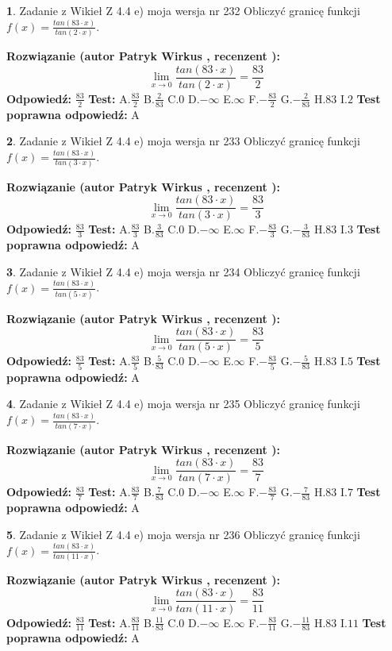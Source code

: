 \documentclass[12pt, a4paper]{article}
\theoremstyle{definition} %
\newtheorem{zad}{}
\newcommand{\zadStart}[1]{\begin{zad}#1\newline}
\newcommand{\zadStop}{\end{zad}}
\newcommand{\rozwStart}[2]{\noindent \textbf{Rozwiązanie (autor #1 , recenzent #2): }\newline}
\newcommand{\rozwStop}{\newline}
\newcommand{\odpStart}{\noindent \textbf{Odpowiedź:}\newline}
\newcommand{\odpStop}{\newline}
\newcommand{\testStart}{\noindent \textbf{Test:}\newline}
\newcommand{\testStop}{\newline}
\newcommand{\kluczStart}{\noindent \textbf{Test poprawna odpowiedź:}\newline}
\newcommand{\kluczStop}{\newline}
\begin{document}
\zadStart{Zadanie z Wikieł Z 4.4 e) moja wersja nr 232}
Obliczyć granicę funkcji $f(x)=\frac{tan(83\cdot x)}{tan(2\cdot x)}$.
\zadStop
\rozwStart{Patryk Wirkus}{}
$$\lim\limits_{x\to 0}\frac{tan(83\cdot x)}{tan(2\cdot x)}=
\frac{83}{2}$$
\rozwStop
\odpStart
$\frac{83}{2}$
\odpStop
\testStart
A.$\frac{83}{2}$
B.$\frac{2}{83}$
C.$0$
D.$-\infty$
E.$\infty$
F.$-\frac{83}{2}$
G.$-\frac{2}{83}$
H.$83$
I.$2$
\testStop
\kluczStart
A
\kluczStop



\zadStart{Zadanie z Wikieł Z 4.4 e) moja wersja nr 233}
Obliczyć granicę funkcji $f(x)=\frac{tan(83\cdot x)}{tan(3\cdot x)}$.
\zadStop
\rozwStart{Patryk Wirkus}{}
$$\lim\limits_{x\to 0}\frac{tan(83\cdot x)}{tan(3\cdot x)}=
\frac{83}{3}$$
\rozwStop
\odpStart
$\frac{83}{3}$
\odpStop
\testStart
A.$\frac{83}{3}$
B.$\frac{3}{83}$
C.$0$
D.$-\infty$
E.$\infty$
F.$-\frac{83}{3}$
G.$-\frac{3}{83}$
H.$83$
I.$3$
\testStop
\kluczStart
A
\kluczStop



\zadStart{Zadanie z Wikieł Z 4.4 e) moja wersja nr 234}
Obliczyć granicę funkcji $f(x)=\frac{tan(83\cdot x)}{tan(5\cdot x)}$.
\zadStop
\rozwStart{Patryk Wirkus}{}
$$\lim\limits_{x\to 0}\frac{tan(83\cdot x)}{tan(5\cdot x)}=
\frac{83}{5}$$
\rozwStop
\odpStart
$\frac{83}{5}$
\odpStop
\testStart
A.$\frac{83}{5}$
B.$\frac{5}{83}$
C.$0$
D.$-\infty$
E.$\infty$
F.$-\frac{83}{5}$
G.$-\frac{5}{83}$
H.$83$
I.$5$
\testStop
\kluczStart
A
\kluczStop



\zadStart{Zadanie z Wikieł Z 4.4 e) moja wersja nr 235}
Obliczyć granicę funkcji $f(x)=\frac{tan(83\cdot x)}{tan(7\cdot x)}$.
\zadStop
\rozwStart{Patryk Wirkus}{}
$$\lim\limits_{x\to 0}\frac{tan(83\cdot x)}{tan(7\cdot x)}=
\frac{83}{7}$$
\rozwStop
\odpStart
$\frac{83}{7}$
\odpStop
\testStart
A.$\frac{83}{7}$
B.$\frac{7}{83}$
C.$0$
D.$-\infty$
E.$\infty$
F.$-\frac{83}{7}$
G.$-\frac{7}{83}$
H.$83$
I.$7$
\testStop
\kluczStart
A
\kluczStop



\zadStart{Zadanie z Wikieł Z 4.4 e) moja wersja nr 236}
Obliczyć granicę funkcji $f(x)=\frac{tan(83\cdot x)}{tan(11\cdot x)}$.
\zadStop
\rozwStart{Patryk Wirkus}{}
$$\lim\limits_{x\to 0}\frac{tan(83\cdot x)}{tan(11\cdot x)}=
\frac{83}{11}$$
\rozwStop
\odpStart
$\frac{83}{11}$
\odpStop
\testStart
A.$\frac{83}{11}$
B.$\frac{11}{83}$
C.$0$
D.$-\infty$
E.$\infty$
F.$-\frac{83}{11}$
G.$-\frac{11}{83}$
H.$83$
I.$11$
\testStop
\kluczStart
A
\kluczStop
\end{document}
